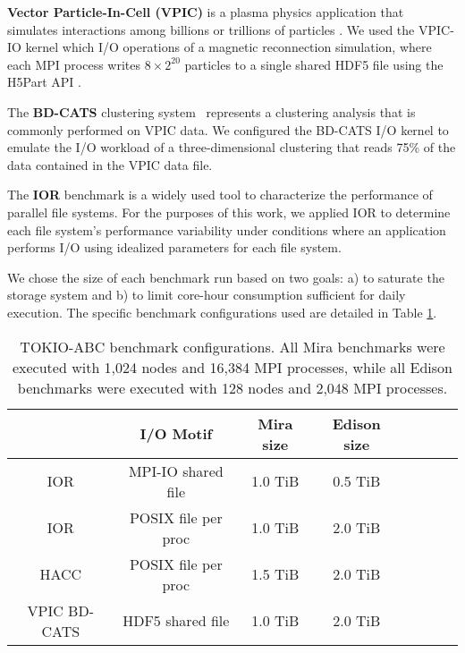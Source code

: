 \textbf{Vector Particle-In-Cell (VPIC)} is a plasma physics application that simulates interactions among billions or trillions of particles \cite{Bowers2008}.
We used the VPIC-IO kernel which I/O operations of a magnetic reconnection simulation, where each MPI process writes $8 \times 2^{20}$ particles
to a single shared HDF5 file using the H5Part API \cite{H5Part}.

The \textbf{BD-CATS} clustering system~\cite{Patwary2015} represents
a clustering analysis that is commonly performed on VPIC data.
We configured the BD-CATS I/O kernel to emulate the I/O workload of
a three-dimensional clustering that reads 75\% of the data
contained in the VPIC data file.

The \textbf{IOR} benchmark is a widely used tool
to characterize the performance of parallel file systems\cite{Yildiz2016,Xie2012,Lofstead2010,Uselton2010}.
For the purposes of this work, we applied IOR to determine each file system's performance variability under conditions where an application performs I/O using idealized parameters for each
file system.

We chose the size of each benchmark run based on two goals:
a) to saturate the storage system and
b) to limit core-hour consumption sufficient for daily execution.
The specific benchmark configurations used are detailed in Table \ref{tab:bench-config}.

\begin{table}[h]
\footnotesize
\centering
\begin{tabular}{|c|c|c|c|c|c|c|c|}
\hline
 & \textbf{I/O Motif} & \textbf{Mira size} & \textbf{Edison size} \\
\hline
IOR & MPI-IO shared file & 1.0 TiB & 0.5 TiB\\
\hline
IOR & POSIX file per proc & 1.0 TiB & 2.0 TiB\\
\hline
HACC & POSIX file per proc & 1.5 TiB & 2.0 TiB \\
\hline
VPIC BD-CATS & HDF5 shared file & 1.0 TiB & 2.0 TiB\\
\hline
\end{tabular}
\caption{TOKIO-ABC benchmark configurations. All Mira benchmarks were
executed with 1,024 nodes and 16,384 MPI processes, while all Edison
benchmarks were executed with 128 nodes and 2,048 MPI processes.}
\label{tab:bench-config}
\normalsize
\vspace{-.4in}
\end{table}


